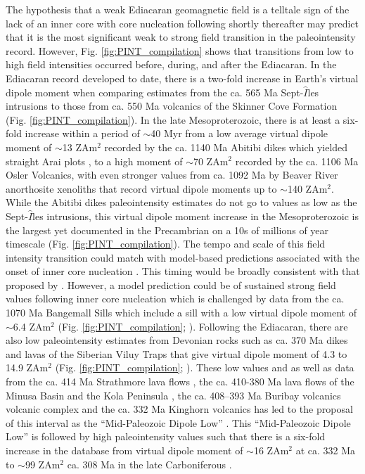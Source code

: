 \documentclass[9pt,twocolumn,twoside,lineno]{pnas-new}
\begin{document}
The hypothesis that a weak Ediacaran geomagnetic field is a telltale sign of the lack of an inner core with core nucleation following shortly thereafter may predict that it is the most significant weak to strong field transition in the paleointensity record. However, Fig. \ref{fig:PINT_compilation} shows that transitions from low to high field intensities occurred before, during, and after the Ediacaran. In the Ediacaran record developed to date, there is a two-fold increase in Earth's virtual dipole moment when comparing estimates from the ca. 565 Ma Sept-$\hat{I}$les intrusions \cite{Bono2019a} to those from ca. 550 Ma volcanics of the Skinner Cove Formation \cite{Thallner2021a} (Fig. \ref{fig:PINT_compilation}). In the late Mesoproterozoic, there is at least a six-fold increase within a period of $\sim$40 Myr from a low average virtual dipole moment of $\sim$13 ZAm$^2$ recorded by the ca. 1140 Ma Abitibi dikes which yielded straight Arai plots \cite{Macouin2003a}, to a high moment of $\sim$70 ZAm$^2$ recorded by the ca. 1106 Ma Osler Volcanics, with even stronger values from ca. 1092 Ma by Beaver River anorthosite xenoliths that record virtual dipole moments up to $\sim$140 ZAm$^2$. While the Abitibi dikes paleointensity estimates do not go to values as low as the Sept-$\hat{I}$les intrusions, this virtual dipole moment increase in the Mesoproterozoic is the largest yet documented in the Precambrian on a 10s of millions of year timescale (Fig. \ref{fig:PINT_compilation}). The tempo and scale of this field intensity transition could match with model-based predictions associated with the onset of inner core nucleation \cite{Davies2021a}. This timing would be broadly consistent with that proposed by \citealp{Biggin2015a}. However, a model prediction could be of sustained strong field values following inner core nucleation which is challenged by data from the ca. 1070 Ma Bangemall Sills which include a sill with a low virtual dipole moment of $\sim$6.4 ZAm$^2$ (Fig. \ref{fig:PINT_compilation};  \citealp{Lloyd2021b}). Following the Ediacaran, there are also low paleointensity estimates from Devonian rocks such as ca. 370 Ma dikes and lavas of the Siberian Viluy Traps that give virtual dipole moment of 4.3 to 14.9 ZAm$^2$ (Fig. \ref{fig:PINT_compilation}; \citealp{Hawkins2019a}). These low values and as well as data from the ca. 414 Ma Strathmore lava flows \cite{Hawkins2021a}, the ca. 410-380 Ma lava flows of the Minusa Basin and the Kola Peninsula \cite{Shcherbakova2017a}, the ca. 408–393 Ma Buribay volcanics  volcanic complex \cite{Shcherbakova2021a} and the ca. 332 Ma Kinghorn volcanics \cite{Hawkins2021a} has led to the proposal of this interval as the ``Mid-Paleozoic Dipole Low'' \cite{Hawkins2021a}. This  ``Mid-Paleozoic Dipole Low'' is followed by high paleointensity values such that there is a six-fold increase in the database from virtual dipole moment of $\sim$16 ZAm$^2$ at ca. 332 Ma to $\sim$99 ZAm$^2$ ca. 308 Ma in the late Carboniferous \cite{Hawkins2021a}. 
\end{document}

